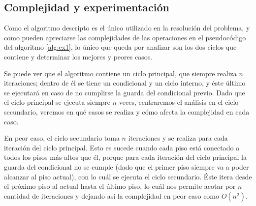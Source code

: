 \documentclass{article}
\theoremstyle{definition}
\theoremstyle{remark}
\begin{document}
\subsection{Complejidad y experimentación}

Como el algoritmo descripto es el único utilizado en la resolución del problema, y como pueden apreciarse las complejidades de las operaciones en el pseudocódigo del algoritmo \ref{alg:ex1}, lo único que queda por analizar son los dos ciclos que contiene y determinar los mejores y peores casos.

Se puede ver que el algoritmo contiene un ciclo principal, que siempre realiza $n$ iteraciones; dentro de él se tiene un condicional y un ciclo interno, y éste último se ejecutará en caso de no cumplirse la guarda del condicional previo. Dado que el ciclo principal se ejecuta siempre $n$ veces, centraremos el análisis en el ciclo secundario, veremos en qué casos se realiza y cómo afecta la complejidad en cada caso.

En peor caso, el ciclo secundario toma $n$ iteraciones y se realiza para cada iteración del ciclo principal. Esto es sucede cuando cada piso está conectado a todos los pisos más altos que él, porque para cada iteración del ciclo principal la guarda del condicional no se cumple (dado que el primer piso siempre va a poder alcanzar al piso actual), con lo cuál se ejecuta el ciclo secundario. Éste itera desde el próximo piso al actual hasta el último piso, lo cuál nos permite acotar por $n$ cantidad de iteraciones y dejando así la complejidad en peor caso como $O(n^2)$.
\end{document}
